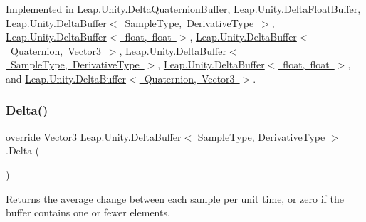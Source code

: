 Implemented in \mbox{\hyperlink{class_leap_1_1_unity_1_1_delta_quaternion_buffer_a4e3c9ef1beee10efb295719e81cdf766}{Leap.\+Unity.\+Delta\+Quaternion\+Buffer}}, \mbox{\hyperlink{class_leap_1_1_unity_1_1_delta_float_buffer_afc1e79b97babd5397852a33e3aa425a7}{Leap.\+Unity.\+Delta\+Float\+Buffer}}, \mbox{\hyperlink{class_leap_1_1_unity_1_1_delta_buffer_a69fad13be5c6bd7117ad0343f6646b8e}{Leap.\+Unity.\+Delta\+Buffer$<$ Sample\+Type, Derivative\+Type $>$}}, \mbox{\hyperlink{class_leap_1_1_unity_1_1_delta_buffer_a69fad13be5c6bd7117ad0343f6646b8e}{Leap.\+Unity.\+Delta\+Buffer$<$ float, float $>$}}, \mbox{\hyperlink{class_leap_1_1_unity_1_1_delta_buffer_a69fad13be5c6bd7117ad0343f6646b8e}{Leap.\+Unity.\+Delta\+Buffer$<$ Quaternion, Vector3 $>$}}, \mbox{\hyperlink{class_leap_1_1_unity_1_1_delta_buffer_a8700bc7a1676ba39977f58debf74f5df}{Leap.\+Unity.\+Delta\+Buffer$<$ Sample\+Type, Derivative\+Type $>$}}, \mbox{\hyperlink{class_leap_1_1_unity_1_1_delta_buffer_a8700bc7a1676ba39977f58debf74f5df}{Leap.\+Unity.\+Delta\+Buffer$<$ float, float $>$}}, and \mbox{\hyperlink{class_leap_1_1_unity_1_1_delta_buffer_a8700bc7a1676ba39977f58debf74f5df}{Leap.\+Unity.\+Delta\+Buffer$<$ Quaternion, Vector3 $>$}}.

\mbox{\label{class_leap_1_1_unity_1_1_delta_buffer_a69fad13be5c6bd7117ad0343f6646b8e}} 
\subsubsection{\texorpdfstring{Delta()}{Delta()}\hspace{0.1cm}{\footnotesize\ttfamily [2/2]}}
{\footnotesize\ttfamily override Vector3 \mbox{\hyperlink{class_leap_1_1_unity_1_1_delta_buffer}{Leap.\+Unity.\+Delta\+Buffer}}$<$ Sample\+Type, Derivative\+Type $>$.Delta (\begin{DoxyParamCaption}{ }\end{DoxyParamCaption})\hspace{0.3cm}{\ttfamily [virtual]}}



Returns the average change between each sample per unit time, or zero if the buffer contains one or fewer elements. 

